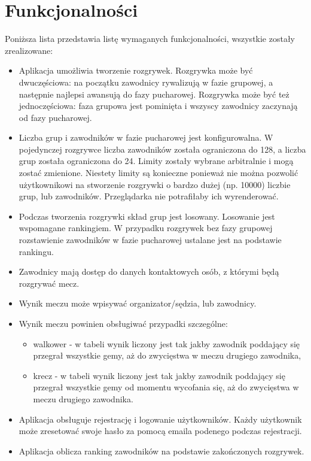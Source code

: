 \documentclass[shortabstract]{iithesis}
\begin{document}
\section{Funkcjonalności}
Poniższa lista przedstawia listę wymaganych funkcjonalności, wszystkie zostały zrealizowane:
\begin{itemize}
    \item Aplikacja umożliwia tworzenie rozgrywek. Rozgrywka może być dwuczęściowa: na początku zawodnicy rywalizują w fazie grupowej, a następnie najlepsi awansują do fazy pucharowej.
          Rozgrywka może być też jednoczęściowa: faza grupowa jest pominięta i wszyscy zawodnicy zaczynają od fazy pucharowej.
    \item Liczba grup i zawodników w fazie pucharowej jest konfigurowalna.
          W pojedynczej rozgrywce liczba zawodników została ograniczona do 128, a liczba grup została ograniczona do 24.
          Limity zostały wybrane arbitralnie i mogą zostać zmienione.
          Niestety limity są konieczne ponieważ nie można pozwolić użytkownikowi na stworzenie rozgrywki o bardzo dużej (np. 10000) liczbie grup, lub zawodników.
          Przeglądarka nie potrafiłaby ich wyrenderować.
    \item Podczas tworzenia rozgrywki skład grup jest losowany. Losowanie jest wspomagane rankingiem.
          W przypadku rozgrywek bez fazy grupowej rozstawienie zawodników w fazie pucharowej ustalane jest na podstawie rankingu.
    \item Zawodnicy mają dostęp do danych kontaktowych osób, z którymi będą rozgrywać mecz.
    \item Wynik meczu może wpisywać organizator/sędzia, lub zawodnicy.
    \item Wynik meczu powinien obsługiwać przypadki szczególne:
          \begin{itemize}
              \item walkower - w tabeli wynik liczony jest tak jakby zawodnik poddający się przegrał wszystkie gemy, aż do zwycięstwa w meczu drugiego zawodnika,
              \item krecz - w tabeli wynik liczony jest tak jakby zawodnik poddający się przegrał wszystkie gemy od momentu wycofania się, aż do zwycięstwa w meczu drugiego zawodnika.
          \end{itemize}
    \item Aplikacja obsługuje rejestrację i logowanie użytkowników. Każdy użytkownik może zresetować swoje hasło za pomocą emaila podenego podczas rejestracji.
    \item Aplikacja oblicza ranking zawodników na podstawie zakończonych rozgrywek.
\end{itemize}
\end{document}
